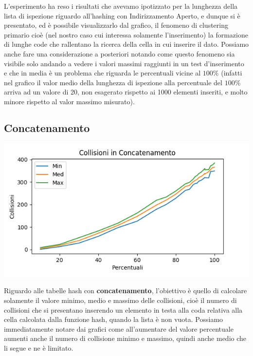 \documentclass{article}
\begin{document}
L'esperimento ha reso i risultati che avevamo ipotizzato per la lunghezza della lista di ispezione riguardo all'hashing con Indirizzamento Aperto, e dunque si è presentato, ed è possibile visualizzarlo dal grafico, il fenomeno di clustering primario cioè (nel nostro caso cui interessa solamente l'inserimento) la formazione di lunghe code che rallentano la ricerca della cella in cui inserire il dato.
Possiamo anche fare una considerazione a posteriori notando come questo fenomeno sia visibile solo andando a vedere i valori massimi raggiunti in un test d'inserimento e che in media è un problema che riguarda le percentuali vicine al $100\%$ (infatti nel grafico il valor medio della lunghezza di ispezione alla percentuale del $100\%$ arriva ad un valore di 20, non esagerato rispetto ai 1000 elementi inseriti, e molto minore rispetto al valor massimo misurato).

\subsection{Concatenamento}

\begin{center}
\includegraphics[scale=0.8]{C_Coll.png}
\end{center}

Riguardo alle tabelle hash con \textbf{concatenamento}, l'obiettivo è quello di calcolare solamente il valore minimo, medio e massimo delle collisioni, cioè il numero di collisioni che si presentano inserendo un elemento in testa alla coda relativa alla cella calcolata dalla funzione hash, quando la lista è non vuota.
Possiamo immediatamente notare dai grafici come all'aumentare del valore percentuale aumenti anche il numero di collisione minimo e massimo, quindi anche medio che li segue e ne è limitato.

%
%
\end{document}
